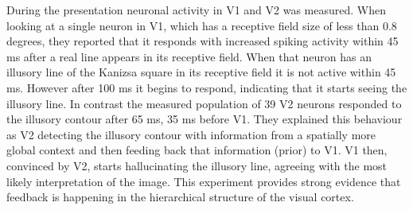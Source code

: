 During the presentation neuronal activity in V1 and V2 was measured. When looking at a single neuron in V1, which has a receptive field size of less than 0.8 degrees, they reported that it responds with increased spiking activity within 45 ms after a real line appears in its receptive field. When that neuron has an illusory line of the Kanizsa square in its receptive field it is not active within 45 ms. However after 100 ms it begins to respond, indicating that it starts seeing the illusory line. In contrast the measured population of 39 V2 neurons responded to the illusory contour after 65 ms, 35 ms before V1. They explained this behaviour as V2 detecting the illusory contour with information from a spatially more global context and then feeding back that information (prior) to V1. V1 then, convinced by V2, starts hallucinating the illusory line, agreeing with the most likely interpretation of the image. This experiment provides strong evidence that feedback is happening in the hierarchical structure of the visual cortex.
 






